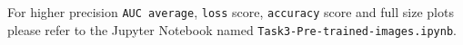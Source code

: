 \documentclass[11pt,a4paper]{article}
\begin{document}
\begin{figure}[H]
{{    }}
    \qquad
\end{figure}
\noindent
For higher precision \texttt{AUC average}, \texttt{loss} score, \texttt{accuracy} score and full size plots please refer to the Jupyter Notebook named \texttt{Task3-Pre-trained-images.ipynb}.
\end{document}
